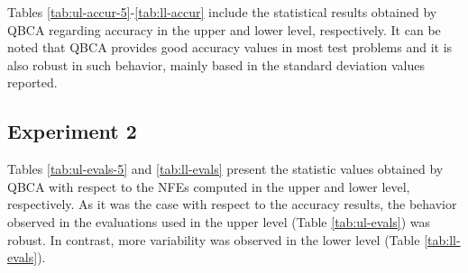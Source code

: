 \documentclass[conference]{IEEEtran}
\theoremstyle{definition}
\begin{document}
Tables \ref{tab:ul-accur-5}-\ref{tab:ll-accur} include the statistical results
obtained by QBCA regarding accuracy in the upper and lower level, respectively.
It can be noted that QBCA provides good accuracy values in most test problems
and it is also robust in such behavior, mainly based in the standard deviation
values reported. 
% 
% 



\subsection{Experiment 2}
Tables \ref{tab:ul-evals-5} and \ref{tab:ll-evals} present the statistic values
obtained by QBCA with respect to the NFEs computed in the upper and lower level,
respectively. As it was the case with respect to the accuracy results, the behavior
observed in the evaluations used in the upper level (Table \ref{tab:ul-evals})
was robust. In contrast, more variability was observed in the lower level
(Table \ref{tab:ll-evals}). 
\end{document}
